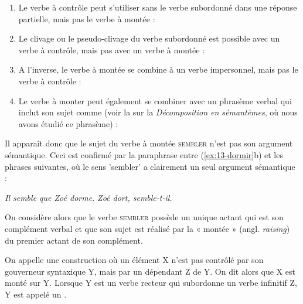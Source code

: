 \begin{enumerate}[label=\arabic*)]
\item	Le verbe à contrôle peut s’utiliser sans le verbe subordonné dans une réponse partielle, mais pas le verbe à montée :
\ea{}
\z\z

\item	Le clivage ou le pseudo-clivage du verbe subordonné est possible avec un verbe à contrôle, mais pas avec un verbe à montée :
\ea{}
\z\z

\item	A l’inverse, le verbe à montée se combine à un verbe impersonnel, mais pas le verbe à contrôle :
\ea{}
\z\z

\item	Le verbe à monter peut également se combiner avec un phrasème verbal qui inclut son sujet comme  (voir la  sur la \textit{Décomposition en sémantèmes}, où nous avons étudié ce phrasème) :
\ea{}
\z\z

\end{enumerate}

Il apparaît donc que le sujet du verbe à montée \textsc{sembler} n’est pas son argument sémantique. Ceci est confirmé par la paraphrase entre (\ref{ex:13-dormir}b) et les phrases suivantes, où le sens 'sembler' a clairement un seul argument sémantique :

\ea\ea \textit{Il semble que Zoé dorme.}
\ex \textit{Zoé dort, semble-t-il.}\z\z

On considère alors que le verbe \textsc{sembler} possède un unique actant qui est son complément verbal et que son sujet est réalisé par la « montée » (angl. \textit{raising}) du premier actant de son complément. 

{On appelle  une construction où un élément X n’est pas contrôlé par son gouverneur syntaxique Y, mais par un dépendant Z de Y. On dit alors que X est monté sur Y. Lorsque Y est un verbe recteur qui subordonne un verbe infinitif Z, Y est appelé un .}

